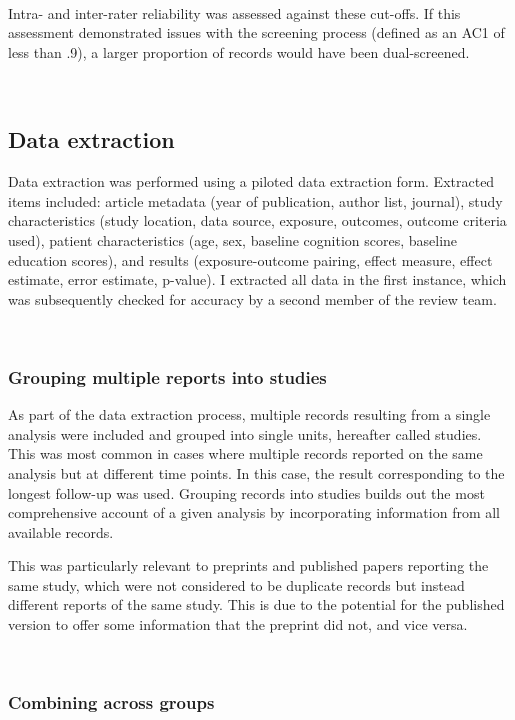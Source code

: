 \documentclass[a4paper, twoside]{templates/ociamthesis}
\begin{document}
~

Intra- and inter-rater reliability was assessed against these cut-offs. If this assessment demonstrated issues with the screening process (defined as an AC1 of less than .9), a larger proportion of records would have been dual-screened.

~

\hypertarget{data-extraction}{%
\subsection{Data extraction}\label{data-extraction}}

Data extraction was performed using a piloted data extraction form. Extracted items included: article metadata (year of publication, author list, journal), study characteristics (study location, data source, exposure, outcomes, outcome criteria used), patient characteristics (age, sex, baseline cognition scores, baseline education scores), and results (exposure-outcome pairing, effect measure, effect estimate, error estimate, p-value). I extracted all data in the first instance, which was subsequently checked for accuracy by a second member of the review team.

~

\hypertarget{grouping-multiple-reports-into-studies}{%
\subsubsection{Grouping multiple reports into studies}\label{grouping-multiple-reports-into-studies}}

As part of the data extraction process, multiple records resulting from a single analysis were included and grouped into single units, hereafter called studies. This was most common in cases where multiple records reported on the same analysis but at different time points. In this case, the result corresponding to the longest follow-up was used. Grouping records into studies builds out the most comprehensive account of a given analysis by incorporating information from all available records.

This was particularly relevant to preprints and published papers reporting the same study, which were not considered to be duplicate records but instead different reports of the same study. This is due to the potential for the published version to offer some information that the preprint did not, and vice versa.

~

\hypertarget{combining-across-groups}{%
\subsubsection{Combining across groups}\label{combining-across-groups}}
\end{document}
